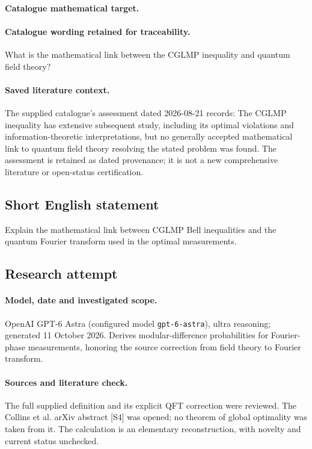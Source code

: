 \documentclass[11pt]{article}
\begin{document}
\paragraph{Catalogue mathematical target.}
\paragraph{Catalogue wording retained for traceability.}
What is the mathematical link between the CGLMP inequality and quantum field theory?

\paragraph{Saved literature context.} The supplied catalogue's assessment dated 2026-08-21 records: The CGLMP inequality has extensive subsequent study, including its optimal violations and information-theoretic interpretations, but no generally accepted mathematical link to quantum field theory resolving the stated problem was found. The assessment is retained as dated provenance; it is not a new comprehensive literature or open-status certification.
\subsection{Short English statement}
Explain the mathematical link between CGLMP Bell inequalities and the quantum Fourier transform used in the optimal measurements.
\subsection{Research attempt}
\paragraph{Model, date and investigated scope.}
OpenAI GPT-6 Astra (configured model \texttt{gpt-6-astra}), ultra reasoning; generated 11 October 2026. Derives modular-difference probabilities for Fourier-phase measurements, honoring the source correction from field theory to Fourier transform.

\paragraph{Sources and literature check.}
The full supplied definition and its explicit QFT correction were reviewed. The Collins et al. arXiv abstract [S4] was opened; no theorem of global optimality was taken from it. The calculation is an elementary reconstruction, with novelty and current status unchecked.
\end{document}
